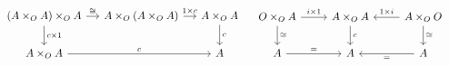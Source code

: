 \[ \begin{array}{cc}

\begin{tikzcd}[column sep=small]
	(A \times_O A) \times_O A \arrow[d,"c \times 1"] \arrow[r,"\cong"] & A \times_O (A \times_O A) \arrow[r,"1 \times c"] & A \times_O A \arrow[d,"c"]\\
	A \times_O A \arrow[rr,"c"] & & A
\end{tikzcd}

&

\begin{tikzcd}
	O \times_O A \arrow[r,"i \times 1"] \arrow[d,"\cong"] & A \times_O A \arrow[d,"c"] & A \times_O O \arrow[l,"1 \times i" above] \arrow[d,"\cong"]\\
	A \arrow[r,"="] & A & A \arrow[l,"="]
\end{tikzcd}

\end{array} \]
